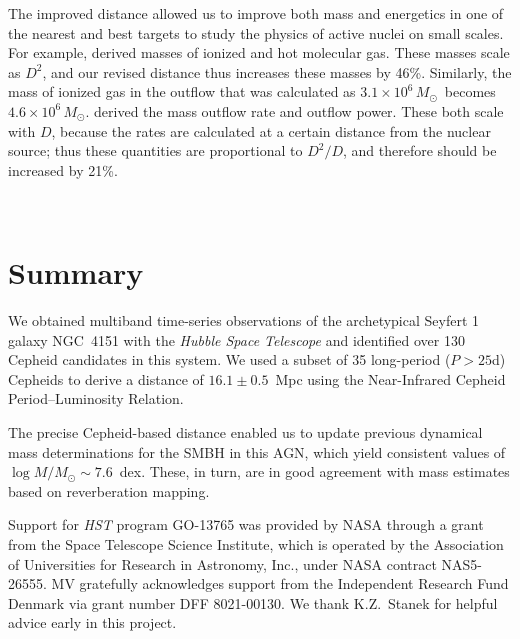 \documentclass[twocolumn]{aastex63}
\renewcommand{\ng}{NGC\ 4151 }
\newcommand{\msun}{\mbox{$M_\odot$}}
\begin{document}
The improved distance allowed us to improve both mass and energetics in one of the nearest and best targets to study the physics of active nuclei on small scales. For example, \cite{Storchi-Bergmann2009} derived  masses of ionized and hot molecular gas. These masses scale as $D^2$, and our revised distance thus increases these masses by 46\%. Similarly, the mass of ionized gas in the outflow that was calculated as $3.1 \times 10^6$\,\msun\ becomes $4.6 \times 10^6$\,\msun. \cite{Storchi-Bergmann2010} derived the mass outflow rate and outflow power. These both scale with $D$, because the rates are calculated at a certain distance from the nuclear source; thus these quantities are proportional to $D^2/D$, and therefore should be increased by 21\%.

\ \par

\section{Summary}

We obtained multiband time-series observations of the archetypical Seyfert 1 galaxy \ng with the {\it Hubble Space Telescope} and identified over 130 Cepheid candidates in this system. We used a subset of 35 long-period ($P\!>\!25$d) Cepheids to derive a distance of $16.1\pm0.5$~Mpc using the Near-Infrared Cepheid Period--Luminosity Relation. 

The precise Cepheid-based distance enabled us to update previous dynamical mass determinations for the SMBH in this AGN, which yield consistent values of $\log M/\msun\sim 7.6$~dex. These, in turn, are in good agreement with mass estimates based on reverberation mapping.

\acknowledgments

Support for {\em HST} program GO-13765 was provided by NASA through a grant from the Space Telescope Science Institute, which is operated by the Association of Universities for Research in Astronomy, Inc., under NASA contract NAS5-26555. MV gratefully acknowledges support from the Independent Research Fund Denmark via grant number DFF 8021-00130. We thank K.Z.~Stanek for helpful advice early in this project.



\end{document}
